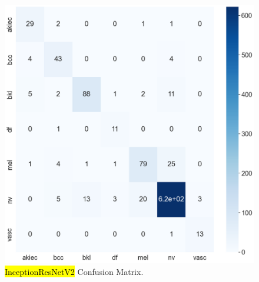 \documentclass[sensors,article,accept,pdftex,moreauthors]{Definitions/mdpi}
\begin{document}
		\begin{figure}[H]
		\begin{minipage}{0.48\textwidth}
\centering
\includegraphics[width=1.2\linewidth]{Definitions/CM/irv2cm}
		\end{minipage}
\caption{\hl{InceptionResNetV2} %
 Confusion Matrix.}\label{fig:irv2cm}
	\end{figure}
	
\end{document}
